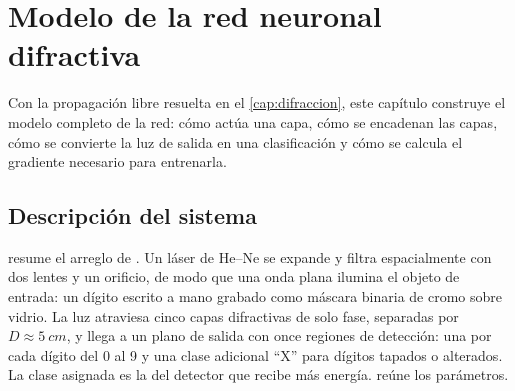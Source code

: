 \chapter{Modelo de la red neuronal difractiva}\label{cap:modelo}

Con la propagación libre resuelta en el \cref{cap:difraccion}, este capítulo construye el
modelo completo de la red: cómo actúa una capa, cómo se encadenan las capas, cómo se
convierte la luz de salida en una clasificación y cómo se calcula el gradiente necesario
para entrenarla.

\section{Descripción del sistema}\label{sec:sistema}

 resume el arreglo de \textcite{chen2021}. Un láser de He--Ne se
expande y filtra espacialmente con dos lentes y un orificio, de modo que una onda plana
ilumina el objeto de entrada: un dígito escrito a mano grabado como máscara binaria de cromo
sobre vidrio. La luz atraviesa cinco capas difractivas de solo fase, separadas por
$D\approx\SI{5}{cm}$, y llega a un plano de salida con once regiones de detección: una por
cada dígito del 0 al 9 y una clase adicional ``X'' para dígitos tapados o alterados. La
clase asignada es la del detector que recibe más energía.  reúne los
parámetros.

